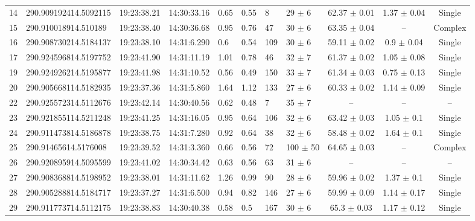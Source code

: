 \begin{table}[htbp!]
\begin{tabular}{llllllllccc}
14  &  290.909192414.5092115  &  19:23:38.21  &  14:30:33.16  &  0.65  &  0.55  &  8  &  29 $\pm$ 6  &  62.37 $\pm$ 0.01  &  1.37 $\pm$ 0.04  &  Single \\
15  &  290.910018914.510189  &  19:23:38.40  &  14:30:36.68  &  0.95  &  0.76  &  47  &  30 $\pm$ 6  &  63.35 $\pm$ 0.04  &  --  &  Complex \\
16  &  290.908730214.5184137  &  19:23:38.10  &  14:31:6.290  &  0.6  &  0.54  &  109  &  30 $\pm$ 6  &  59.11 $\pm$ 0.02  &  0.9 $\pm$ 0.04  &  Single \\
17  &  290.924596814.5197752  &  19:23:41.90  &  14:31:11.19  &  1.01  &  0.78  &  46  &  32 $\pm$ 7  &  61.37 $\pm$ 0.02  &  1.05 $\pm$ 0.08  &  Single \\
19  &  290.924926214.5195877  &  19:23:41.98  &  14:31:10.52  &  0.56  &  0.49  &  150  &  33 $\pm$ 7  &  61.34 $\pm$ 0.03  &  0.75 $\pm$ 0.13  &  Single \\
20  &  290.905668114.5182935  &  19:23:37.36  &  14:31:5.860  &  1.64  &  1.12  &  133  &  27 $\pm$ 6  &  60.33 $\pm$ 0.02  &  1.14 $\pm$ 0.09  &  Single \\
22  &  290.925572314.5112676  &  19:23:42.14  &  14:30:40.56  &  0.62  &  0.48  &  7  &  35 $\pm$ 7  &  --  &  --  &  -- \\
23  &  290.921855114.5211248  &  19:23:41.25  &  14:31:16.05  &  0.95  &  0.64  &  106  &  32 $\pm$ 6  &  63.42 $\pm$ 0.03  &  1.05 $\pm$ 0.1  &  Single \\
24  &  290.911473814.5186878  &  19:23:38.75  &  14:31:7.280  &  0.92  &  0.64  &  38  &  32 $\pm$ 6  &  58.48 $\pm$ 0.02  &  1.64 $\pm$ 0.1  &  Single \\
25  &  290.91465614.5176008  &  19:23:39.52  &  14:31:3.360  &  0.66  &  0.56  &  72  &  100 $\pm$ 50  &  64.65 $\pm$ 0.03  &  --  &  Complex \\
26  &  290.920895914.5095599  &  19:23:41.02  &  14:30:34.42  &  0.63  &  0.56  &  63  &  31 $\pm$ 6  &  --  &  --  &  -- \\
27  &  290.908368814.5198952  &  19:23:38.01  &  14:31:11.62  &  1.26  &  0.99  &  90  &  28 $\pm$ 6  &  59.96 $\pm$ 0.02  &  1.37 $\pm$ 0.1  &  Single \\
28  &  290.905288814.5184717  &  19:23:37.27  &  14:31:6.500  &  0.94  &  0.82  &  146  &  27 $\pm$ 6  &  59.99 $\pm$ 0.09  &  1.14 $\pm$ 0.17  &  Single \\
29  &  290.911773714.5112175  &  19:23:38.83  &  14:30:40.38  &  0.58  &  0.5  &  167  &  30 $\pm$ 6  &  65.3 $\pm$ 0.03  &  1.17 $\pm$ 0.12  &  Single \\

\end{tabular}
\end{table}
